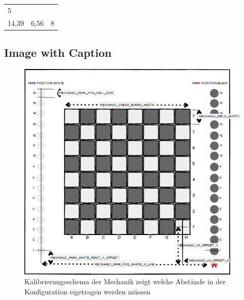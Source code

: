 \begin{longtable}[]{@{}lll@{}}
\begin{minipage}[t]{0.34\columnwidth}
5\strut
\end{minipage}\tabularnewline
\begin{minipage}[t]{0.29\columnwidth}\raggedright
14,39\strut
\end{minipage} & \begin{minipage}[t]{0.29\columnwidth}\raggedright
6,56\strut
\end{minipage} & \begin{minipage}[t]{0.34\columnwidth}\raggedright
8\strut
\end{minipage}\tabularnewline
\bottomrule
\end{longtable}

\hypertarget{image-with-caption}{%
\subsection{Image with Caption}\label{image-with-caption}}

\begin{figure}
\centering
\includegraphics{OLD/images/ATC_Calibration_Guide.png}
\caption{Kalibrierungeschema der Mechanik zeigt welche Abstände in der
Konfiguration eigetragen werden müssen}
\end{figure}